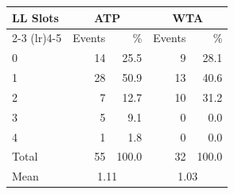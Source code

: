 \begin{tabular}{l rr rr}
\toprule
LL Slots & \multicolumn{2}{c}{ATP} & \multicolumn{2}{c}{WTA} \\
\cmidrule(lr){2-3}
\cmidrule(lr){4-5}
 & Events & \% & Events & \% \\
\midrule
0 & 14 & 25.5 & 9 & 28.1 \\
1 & 28 & 50.9 & 13 & 40.6 \\
2 & 7 & 12.7 & 10 & 31.2 \\
3 & 5 & 9.1 & 0 & 0.0 \\
4 & 1 & 1.8 & 0 & 0.0 \\
\midrule
Total & 55 & 100.0 & 32 & 100.0 \\
Mean & \multicolumn{2}{c}{1.11} & \multicolumn{2}{c}{1.03} \\
\bottomrule
\end{tabular}

